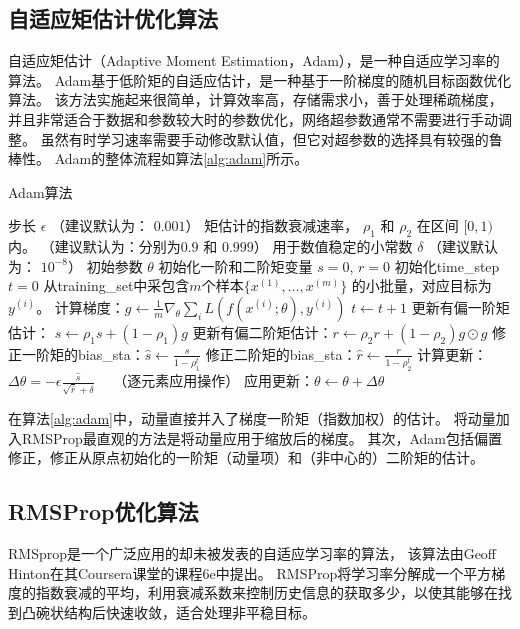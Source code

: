 \subsection{自适应矩估计优化算法}
\label{sec:adam}
自适应矩估计（Adaptive Moment Estimation，Adam），是一种自适应学习率的算法\cite{kingma2014adam}。
Adam基于低阶矩的自适应估计，是一种基于一阶梯度的随机目标函数优化算法。
该方法实施起来很简单，计算效率高，存储需求小，善于处理稀疏梯度，
并且非常适合于数据和参数较大时的参数优化，网络超参数通常不需要进行手动调整。
虽然有时学习速率需要手动修改默认值，但它对超参数的选择具有较强的鲁棒性。
Adam的整体流程如算法\ref{alg:adam}所示。
\begin{algorithm}[ht]
	\caption{Adam算法}
	\label{alg:adam}
	\begin{algorithmic}
		\REQUIRE 步长 $\epsilon$ （建议默认为： $0.001$）
		\REQUIRE 矩估计的指数衰减速率， $\rho_1$ 和 $\rho_2$ 在区间 $[0, 1)$内。
		（建议默认为：分别为$0.9$ 和 $0.999$）
		\REQUIRE 用于数值稳定的小常数 $\delta$  （建议默认为： $10^{-8}$）
		\REQUIRE 初始参数 $\theta$
		\STATE 初始化一阶和二阶矩变量 $s = 0 $, $r = 0$
		\STATE 初始化\gls{time_step} $t=0$ 
		\STATE 从\gls{training_set}中采包含$m$个样本$\{ x^{(1)},\dots, x^{(m)}\}$ 的小批量，对应目标为$y^{(i)}$。
		\STATE 计算梯度：$g \leftarrow \frac{1}{m} \nabla_{\theta} \sum_i L(f(x^{(i)};\theta),y^{(i)})$ 
		\STATE $t \leftarrow t + 1$
		\STATE 更新有偏一阶矩估计： $s \leftarrow \rho_1 s + (1-\rho_1) g$
		\STATE 更新有偏二阶矩估计：$r \leftarrow \rho_2 r + (1-\rho_2)  g \odot g$
		\STATE 修正一阶矩的\gls{bias_sta}：$\hat{s} \leftarrow \frac{s}{1-\rho_1^t}$
		\STATE 修正二阶矩的\gls{bias_sta}：$\hat{r} \leftarrow \frac{r}{1-\rho_2^t}$
		\STATE 计算更新：$\Delta \theta = - \epsilon \frac{\hat{s}}{\sqrt{\hat{r}} + \delta}$ \ \  （逐元素应用操作）
		\STATE 应用更新：$\theta \leftarrow \theta + \Delta \theta$
		\ENDWHILE
	\end{algorithmic}
\end{algorithm}
在算法\ref{alg:adam}中，动量直接并入了梯度一阶矩（指数加权）的估计。
将动量加入RMSProp最直观的方法是将动量应用于缩放后的梯度。
其次，Adam包括偏置修正，修正从原点初始化的一阶矩（动量项）和（非中心的）二阶矩的估计。
\par

\subsection{RMSProp优化算法}
RMSprop是一个广泛应用的却未被发表的自适应学习率的算法，
该算法由Geoff Hinton在其Coursera课堂的课程6e中提出\cite{tieleman2012lecture}。
RMSProp将学习率分解成一个平方梯度的指数衰减的平均，利用衰减系数来控制历史信息的获取多少，以使其能够在找到凸碗状结构后快速收敛，适合处理非平稳目标。\par

